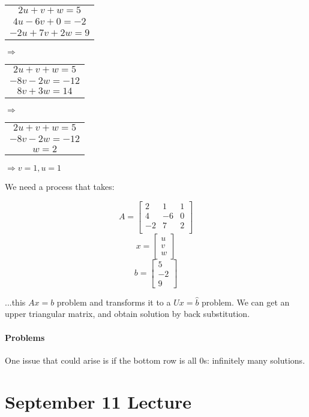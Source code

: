 \documentclass[12pt]{article}
\newcommand{\<}{\langle}
\renewcommand{\>}{\rangle}
\begin{document}
\begin{tabular}{c}
	$2u + v + w = 5$ \\
	$4u - 6v + 0 = -2$ \\
	$-2u + 7v + 2w = 9$ \\\hline
\end{tabular}

$\Rightarrow$
\begin{tabular}{c}
	$2u + v + w = 5$ \\
	   $-8v - 2w = -12$ \\
         $8v + 3w = 14$ \\\hline
\end{tabular}

$\Rightarrow$
\begin{tabular}{c}
	$2u + v + w = 5$ \\
	   $-8v - 2w = -12$ \\
         $w = 2$ \\\hline
\end{tabular}

$\Rightarrow v = 1, u = 1$

We need a process that takes:

\[
	A = \begin{bmatrix}
		2 & 1 & 1 \\
		4 & -6 & 0 \\
		-2 & 7 & 2 \\
	\end{bmatrix}
\]
\[
	x = \begin{bmatrix}
		u \\ v \\ w
	\end{bmatrix}
\]
\[
	b = \begin{bmatrix}
		5 \\ -2 \\ 9
	\end{bmatrix}
\]

...this $Ax=b$ problem and transforms it to a $Ux = \hat{b}$ problem. We can get an upper triangular matrix, and obtain solution by back substitution.

\paragraph{Problems} One issue that could arise is if the bottom row is all 0s: infinitely many solutions.

\section{September 11 Lecture}
\end{document}
